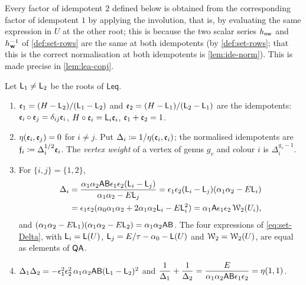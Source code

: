 Every factor of idempotent $2$ defined below is obtained from the corresponding factor of idempotent $1$ by applying the involution, that is, by evaluating the same expression in $U$ at the other root; this is because the two scalar series $h_{\mathsf{nw}}$ and $h_{\mathbf{w}}^{-1}$ of \cref{def:set-rows} are the same at both idempotents (by \cref{def:set-rows}; that this is the correct normalisation at both idempotents is \cref{lem:ide-norm}). This is made precise in \cref{lem:lea-conj}.

\begin{prop}
\label{prop:set-idem}
Let $\mathsf{L}_1\neq\mathsf{L}_2$ be the roots of $\mathsf{Leq}$.
\begin{enumerate}
\item $\mathfrak{e}_1=(H-\mathsf{L}_2)/(\mathsf{L}_1-\mathsf{L}_2)$ and $\mathfrak{e}_2=(H-\mathsf{L}_1)/(\mathsf{L}_2-\mathsf{L}_1)$ are the idempotents: $\mathfrak{e}_i\circ\mathfrak{e}_j=\delta_{ij}\mathfrak{e}_i$, $H\circ\mathfrak{e}_i=\mathsf{L}_i\mathfrak{e}_i$, $\mathfrak{e}_1+\mathfrak{e}_2=1$.
\item $\eta(\mathfrak{e}_i,\mathfrak{e}_j)=0$ for $i\neq j$. Put $\Delta_i\coloneqq1/\eta(\mathfrak{e}_i,\mathfrak{e}_i)$; the normalised idempotents are $\mathfrak{f}_i\coloneqq\Delta_i^{1/2}\mathfrak{e}_i$. The \emph{vertex weight} of a vertex of genus $g_v$ and colour $i$ is $\Delta_i^{g_v-1}$.
\item For $\{i,j\}=\{1,2\}$,
\begin{equation}
\label{eq:set-Delta}
\begin{split}
\Delta_i&=\frac{\alpha_1\alpha_2\mathsf{A}\mathsf{B}\epsilon_1\epsilon_2(\mathsf{L}_i-\mathsf{L}_j)}{\alpha_1\alpha_2-E\mathsf{L}_j}
=\epsilon_1\epsilon_2(\mathsf{L}_i-\mathsf{L}_j)(\alpha_1\alpha_2-E\mathsf{L}_i)\\
&=\epsilon_1\epsilon_2(\alpha_0\alpha_1\alpha_2+2\alpha_1\alpha_2\mathsf{L}_i-E\mathsf{L}_i^2)
=\alpha_1\mathsf{A}\epsilon_1\epsilon_2\,\mathcal{W}_2(U_i),
\end{split}
\end{equation}
and $(\alpha_1\alpha_2-E\mathsf{L}_1)(\alpha_1\alpha_2-E\mathsf{L}_2)=\alpha_1\alpha_2\mathsf{A}\mathsf{B}$. The four expressions of \eqref{eq:set-Delta}, with $\mathsf{L}_i=\mathsf{L}(U)$, $\mathsf{L}_j=E/\tau-\alpha_0-\mathsf{L}(U)$ and $\mathcal{W}_2=\mathcal{W}_2(U)$, are equal as elements of $\mathsf{QA}$.
\item $\Delta_1\Delta_2=-\epsilon_1^2\epsilon_2^2\,\alpha_1\alpha_2\mathsf{A}\mathsf{B}(\mathsf{L}_1-\mathsf{L}_2)^2$ and $\dfrac1{\Delta_1}+\dfrac1{\Delta_2}=\dfrac{E}{\alpha_1\alpha_2\mathsf{A}\mathsf{B}\epsilon_1\epsilon_2}=\eta(1,1)$.
\end{enumerate}
\end{prop}

